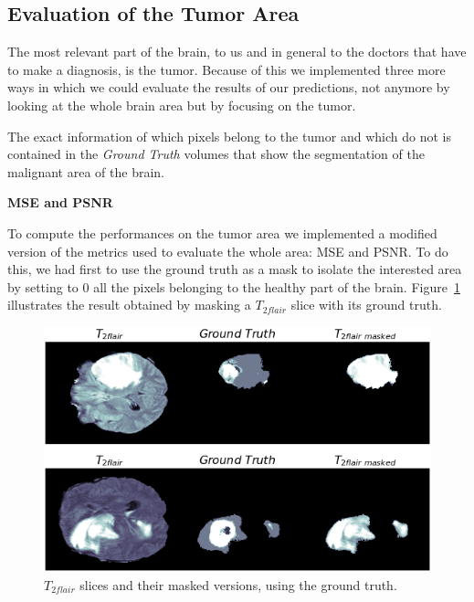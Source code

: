 \subsection{Evaluation of the Tumor Area}
\label{subsec:eval_tumor_area}

The most relevant part of the brain, to us and in general to the doctors that have to make a diagnosis, is the tumor. Because of this we implemented three more ways in which we could evaluate the results of our predictions, not anymore by looking at the whole brain area but by focusing on the tumor. 

The exact information of which pixels belong to the tumor and which do not is contained in the \textit{Ground Truth} volumes that show the segmentation of the malignant area of the brain.

\vspace{6mm} 
\noindent\textbf{MSE and PSNR} 

\vspace{2mm}
\noindent To compute the performances on the tumor area we implemented a modified version of the metrics used to evaluate the whole area: MSE and PSNR.
To do this, we had first to use the ground truth as a mask to isolate the interested area by setting to 0 all the pixels belonging to the healthy part of the brain.
Figure~\ref{fig:brain_masked} illustrates the result obtained by masking a $T_{2flair}$ slice with its ground truth.

\begin{figure}[H]
\centering
\includegraphics[height=0.30\textheight]{images/brain_tumor_masked.pdf}
\caption[$T_{2flair}$ slices masked with the ground truth]{$T_{2flair}$ slices and their masked versions, using the ground truth.}
\label{fig:brain_masked}
\end{figure}

